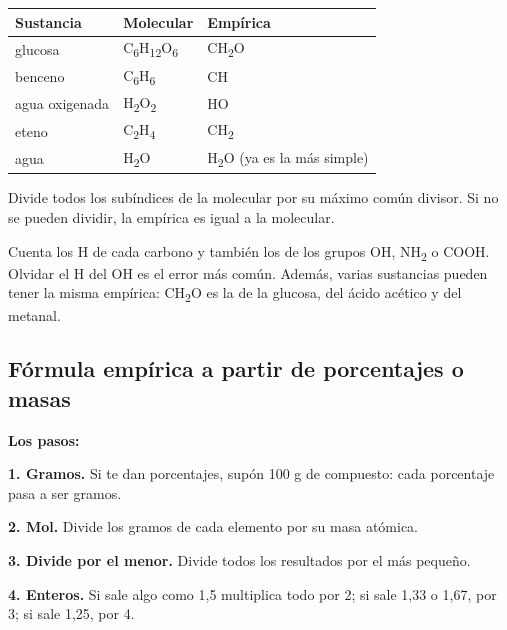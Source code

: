 \begin{center}\small
\begin{tabular}{@{}lll@{}}
\toprule
\textbf{Sustancia} & \textbf{Molecular} & \textbf{Empírica} \\
\midrule
glucosa & C\textsubscript{6}H\textsubscript{12}O\textsubscript{6} & CH\textsubscript{2}O \\
benceno & C\textsubscript{6}H\textsubscript{6} & CH \\
agua oxigenada & H\textsubscript{2}O\textsubscript{2} & HO \\
eteno & C\textsubscript{2}H\textsubscript{4} & CH\textsubscript{2} \\
agua & H\textsubscript{2}O & H\textsubscript{2}O (ya es la más simple) \\
\bottomrule
\end{tabular}
\end{center}
 
\begin{clave} Divide todos los subíndices de la molecular por su máximo común divisor. Si no se pueden dividir, la empírica es igual a la molecular.\end{clave}
 
\begin{ojo} Cuenta los H de cada carbono y también los de los grupos OH, NH\textsubscript{2} o COOH. Olvidar el H del OH es el error más común. Además, varias sustancias pueden tener la misma empírica: CH\textsubscript{2}O es la de la glucosa, del ácido acético y del metanal.\end{ojo}
\subsection{Fórmula empírica a partir de porcentajes o masas}
\textbf{Los pasos:}

 

\textbf{1. Gramos.} Si te dan porcentajes, supón 100 g de compuesto: cada porcentaje pasa a ser gramos.

 

\textbf{2. Mol.} Divide los gramos de cada elemento por su masa atómica.

 

\textbf{3. Divide por el menor.} Divide todos los resultados por el más pequeño.

 

\textbf{4. Enteros.} Si sale algo como 1,5 multiplica todo por 2; si sale 1,33 o 1,67, por 3; si sale 1,25, por 4.

